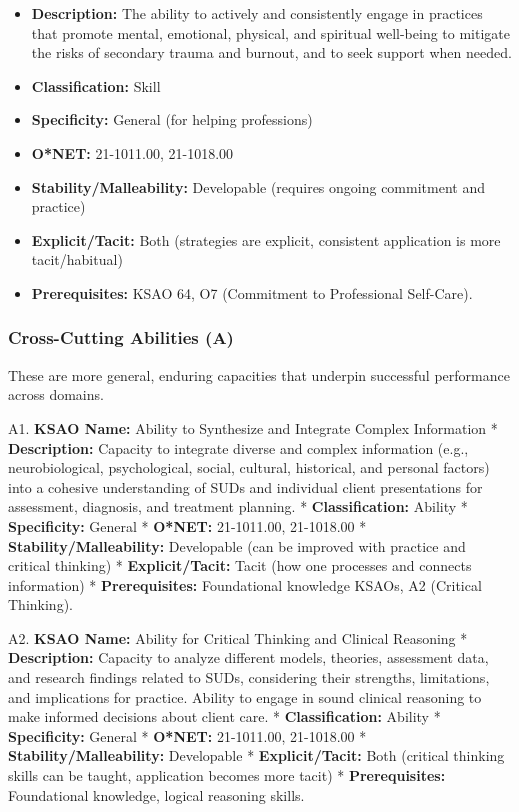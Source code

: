 \documentclass[
  letterpaper,
  DIV=11,
  numbers=noendperiod]{scrartcl}
\providecommand{\tightlist}{%
  \setlength{\itemsep}{0pt}\setlength{\parskip}{0pt}}
\begin{document}
\begin{enumerate}
  \begin{itemize}
  \tightlist
  \item
    \textbf{Description:} The ability to actively and consistently
    engage in practices that promote mental, emotional, physical, and
    spiritual well-being to mitigate the risks of secondary trauma and
    burnout, and to seek support when needed.
  \item
    \textbf{Classification:} Skill
  \item
    \textbf{Specificity:} General (for helping professions)
  \item
    \textbf{O*NET:} 21-1011.00, 21-1018.00
  \item
    \textbf{Stability/Malleability:} Developable (requires ongoing
    commitment and practice)
  \item
    \textbf{Explicit/Tacit:} Both (strategies are explicit, consistent
    application is more tacit/habitual)
  \item
    \textbf{Prerequisites:} KSAO 64, O7 (Commitment to Professional
    Self-Care).
  \end{itemize}
\end{enumerate}

\subsubsection{Cross-Cutting Abilities
(A)}\label{cross-cutting-abilities-a}

These are more general, enduring capacities that underpin successful
performance across domains.

A1. \textbf{KSAO Name:} Ability to Synthesize and Integrate Complex
Information * \textbf{Description:} Capacity to integrate diverse and
complex information (e.g., neurobiological, psychological, social,
cultural, historical, and personal factors) into a cohesive
understanding of SUDs and individual client presentations for
assessment, diagnosis, and treatment planning. *
\textbf{Classification:} Ability * \textbf{Specificity:} General *
\textbf{O*NET:} 21-1011.00, 21-1018.00 *
\textbf{Stability/Malleability:} Developable (can be improved with
practice and critical thinking) * \textbf{Explicit/Tacit:} Tacit (how
one processes and connects information) * \textbf{Prerequisites:}
Foundational knowledge KSAOs, A2 (Critical Thinking).

A2. \textbf{KSAO Name:} Ability for Critical Thinking and Clinical
Reasoning * \textbf{Description:} Capacity to analyze different models,
theories, assessment data, and research findings related to SUDs,
considering their strengths, limitations, and implications for practice.
Ability to engage in sound clinical reasoning to make informed decisions
about client care. * \textbf{Classification:} Ability *
\textbf{Specificity:} General * \textbf{O*NET:} 21-1011.00, 21-1018.00 *
\textbf{Stability/Malleability:} Developable * \textbf{Explicit/Tacit:}
Both (critical thinking skills can be taught, application becomes more
tacit) * \textbf{Prerequisites:} Foundational knowledge, logical
reasoning skills.
\end{document}
